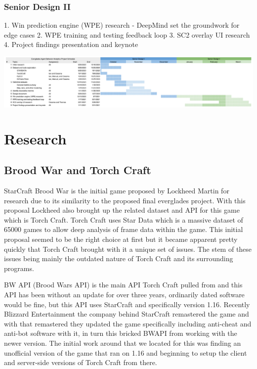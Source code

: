 \documentclass[a4paper,12pt]{report}
\begin{document}
\subsection{Senior Design II}

1. Win prediction engine (WPE) research
- DeepMind set the groundwork for edge cases
2. WPE training and testing feedback loop
3. SC2 overlay UI research
4. Project findings presentation and keynote

\begin{center}
    \captionsetup{type=figure}
    \includegraphics[width=.9\linewidth]{media/gantt.png}
\end{center}

\chapter{Research}
\section{Brood War and Torch Craft}

StarCraft Brood War is the initial game proposed by Lockheed Martin for research due to its similarity to the proposed final everglades project. With this proposal Lockheed also brought up the related dataset and API for this game which is Torch Craft. Torch Craft uses Star Data which is a massive dataset of 65000 games to allow deep analysis of frame data within the game. This initial proposal seemed to be the right choice at first but it became apparent pretty quickly that Torch Craft brought with it a unique set of issues. The stem of these issues being mainly the outdated nature of Torch Craft and its surrounding programs.

BW API (Brood Wars API) is the main API Torch Craft pulled from and this API has been without an update for over three years, ordinarily dated software would be fine, but this API uses StarCraft and specifically version 1.16. Recently Blizzard Entertainment the company behind StarCraft remastered the game and with that remastered they updated the game specifically including anti-cheat and anti-bot software with it, in turn this bricked BWAPI from working with the newer version. The initial work around that we located for this was finding an unofficial version of the game that ran on 1.16 and beginning to setup the client and server-side versions of Torch Craft from there. 
\end{document}
